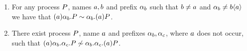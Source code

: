 \begin{proposition}\label{prop:behavior_auth_and_prefixes}
\leavevmode
\begin{enumerate}
\item For any process $P$, names $a,b$ and prefix $\alpha_b$ such that $b \neq a$ and $\alpha_b \neq b\langle a\rangle$
we have that $(a)\alpha_b.P \sim \alpha_b.(a)P$.%
\item There exist process $P$, name $a$ and prefixes $\alpha_{b},\alpha_{c}$, where $a$ does not occur, such that $(a)\alpha_b.\alpha_c.P \not\sim \alpha_b.\alpha_c.(a)P$. %
%


\end{enumerate}
\end{proposition}
